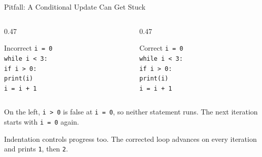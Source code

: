 \documentclass[aspectratio=169,10pt]{beamer}
\begin{document}
\begin{frame}[t]{Pitfall: A Conditional Update Can Get Stuck}
  \small
  \begin{columns}[T,onlytextwidth]
    \begin{column}{0.47\textwidth}
      \begin{alertblock}{Incorrect}
        \texttt{i = 0}\\
        \texttt{while i < 3:}\\
        \hspace{0.18in}\texttt{if i > 0:}\\
        \hspace{0.36in}\texttt{print(i)}\\
        \hspace{0.36in}\texttt{i = i + 1}
      \end{alertblock}
    \end{column}
    \begin{column}{0.47\textwidth}
      \begin{block}{Correct}
        \texttt{i = 0}\\
        \texttt{while i < 3:}\\
        \hspace{0.18in}\texttt{if i > 0:}\\
        \hspace{0.36in}\texttt{print(i)}\\
        \hspace{0.18in}\texttt{i = i + 1}
      \end{block}
    \end{column}
  \end{columns}
  On the left, \texttt{i > 0} is false at \texttt{i = 0}, so neither statement runs. The next iteration starts with \texttt{i = 0} again.
  \begin{keyidea}
    Indentation controls progress too. The corrected loop advances on every iteration and prints \texttt{1}, then \texttt{2}.
  \end{keyidea}
\end{frame}
\end{document}
